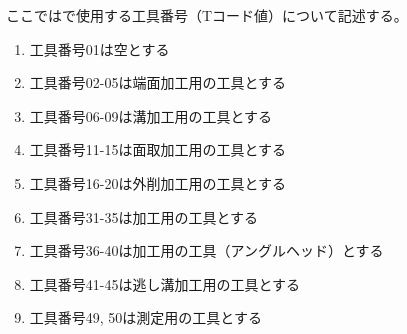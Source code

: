 

ここでは\DMname で使用する工具番号（Tコード値）について記述する。


\begin{enumerate}[label=\Roman*), ref=\Roman*)]
\item 工具番号01は空とする
\item 工具番号02-05は端面加工用の工具とする
\item 工具番号06-09は溝加工用の工具とする
\item 工具番号11-15は面取加工用の工具とする
\item 工具番号16-20は外削加工用の工具とする
\item 工具番号31-35は\dimple 加工用の工具とする
\item 工具番号36-40は\dimple 加工用の工具（アングルヘッド）とする
\item 工具番号41-45は逃し溝加工用の工具とする
\item 工具番号49, 50は測定用の工具とする
\end{enumerate}



